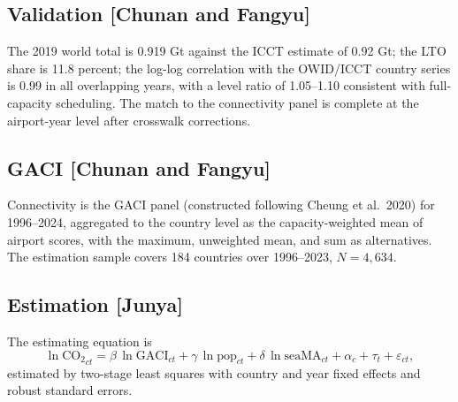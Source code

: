 \documentclass[12pt]{article}
\begin{document}
\subsection*{Validation [Chunan and Fangyu]}
The 2019 world total is 0.919 Gt against the ICCT estimate of 0.92 Gt; the
LTO share is 11.8 percent; the log-log correlation with the OWID/ICCT
country series is 0.99 in all overlapping years, with a level ratio of
1.05--1.10 consistent with full-capacity scheduling. The match to the
connectivity panel is complete at the airport-year level after crosswalk
corrections.

\subsection*{GACI [Chunan and Fangyu]}
Connectivity is the GACI panel (constructed following Cheung et al.\ 2020)
for 1996--2024, aggregated to the country level as the capacity-weighted
mean of airport scores, with the maximum, unweighted mean, and sum as
alternatives. The estimation sample covers 184 countries over 1996--2023,
$N = 4{,}634$.

\subsection*{Estimation [Junya]}
The estimating equation is
\begin{equation}
\ln \mathrm{CO_2}_{ct} = \beta \,\ln \mathrm{GACI}_{ct}
 + \gamma \,\ln \mathrm{pop}_{ct} + \delta \,\ln \mathrm{seaMA}_{ct}
 + \alpha_c + \tau_t + \varepsilon_{ct},
\label{eq:main}
\end{equation}
estimated by two-stage least squares with country and year fixed effects
and robust standard errors.
\end{document}
